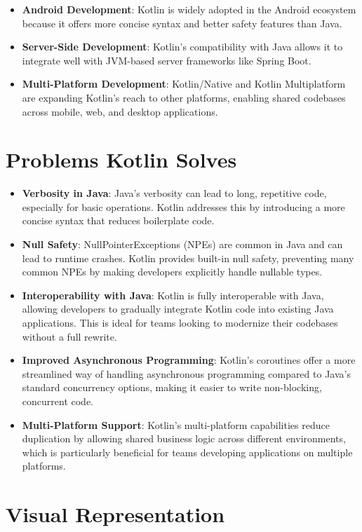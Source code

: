 \begin{itemize}
    \item \textbf{Android Development}: Kotlin is widely adopted in the Android ecosystem because it offers more concise syntax and better safety features than Java.
    \item \textbf{Server-Side Development}: Kotlin’s compatibility with Java allows it to integrate well with JVM-based server frameworks like Spring Boot.
    \item \textbf{Multi-Platform Development}: Kotlin/Native and Kotlin Multiplatform are expanding Kotlin's reach to other platforms, enabling shared codebases across mobile, web, and desktop applications.
\end{itemize}

\section{Problems Kotlin Solves}

\begin{itemize}
    \item \textbf{Verbosity in Java}: Java's verbosity can lead to long, repetitive code, especially for basic operations. Kotlin addresses this by introducing a more concise syntax that reduces boilerplate code.
    \item \textbf{Null Safety}: NullPointerExceptions (NPEs) are common in Java and can lead to runtime crashes. Kotlin provides built-in null safety, preventing many common NPEs by making developers explicitly handle nullable types.
    \item \textbf{Interoperability with Java}: Kotlin is fully interoperable with Java, allowing developers to gradually integrate Kotlin code into existing Java applications. This is ideal for teams looking to modernize their codebases without a full rewrite.
    \item \textbf{Improved Asynchronous Programming}: Kotlin’s coroutines offer a more streamlined way of handling asynchronous programming compared to Java’s standard concurrency options, making it easier to write non-blocking, concurrent code.
    \item \textbf{Multi-Platform Support}: Kotlin's multi-platform capabilities reduce duplication by allowing shared business logic across different environments, which is particularly beneficial for teams developing applications on multiple platforms.
\end{itemize}

\section{Visual Representation}

